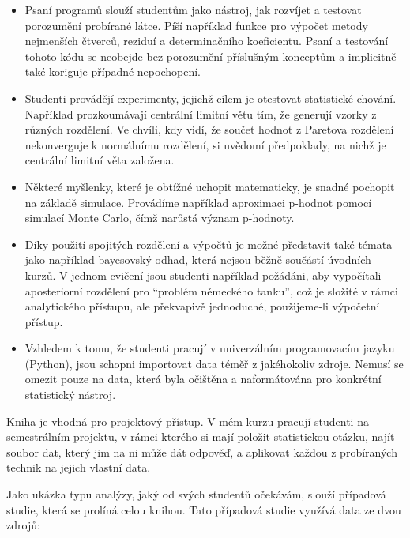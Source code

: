 \documentclass[12pt]{book}
\begin{document}
\begin{itemize}

\item Psaní programů slouží studentům jako nástroj, jak rozvíjet a testovat porozumění probírané látce. Píší například funkce pro výpočet metody nejmenších čtverců, reziduí a determinačního koeficientu. Psaní a testování tohoto kódu se neobejde bez porozumění příslušným konceptům a implicitně také koriguje případné nepochopení.

\item Studenti provádějí experimenty, jejichž cílem je otestovat statistické chování. Například prozkoumávají centrální limitní větu tím, že generují vzorky z různých rozdělení. Ve chvíli, kdy vidí, že součet hodnot z Paretova rozdělení nekonverguje k normálnímu rozdělení, si uvědomí předpoklady, na nichž je centrální limitní věta založena.

\item Některé myšlenky, které je obtížné uchopit matematicky, je snadné pochopit na základě simulace. Provádíme například aproximaci p-hodnot pomocí simulací Monte Carlo, čímž narůstá význam p-hodnoty.

\item Díky použití spojitých rozdělení a výpočtů je možné představit také témata jako například bayesovský odhad, která nejsou běžně součástí úvodních kurzů. V jednom cvičení jsou studenti například požádáni, aby vypočítali aposteriorní rozdělení pro ``problém německého tanku'', což je složité v rámci analytického přístupu, ale překvapivě jednoduché, použijeme-li výpočetní přístup.

\item Vzhledem k tomu, že studenti pracují v univerzálním programovacím jazyku (Python), jsou schopni importovat data téměř z jakéhokoliv zdroje. Nemusí se omezit pouze na data, která byla očištěna a naformátována pro konkrétní statistický nástroj.

\end{itemize}

Kniha je vhodná pro projektový přístup. V mém kurzu pracují studenti na semestrálním projektu, v rámci kterého si mají položit statistickou otázku, najít soubor dat, který jim na ni může dát odpověď, a aplikovat každou z probíraných technik na jejich vlastní data.

Jako ukázka typu analýzy, jaký od svých studentů očekávám, slouží případová studie, která se prolíná celou knihou.  Tato případová studie využívá data ze dvou zdrojů:
\end{document}
